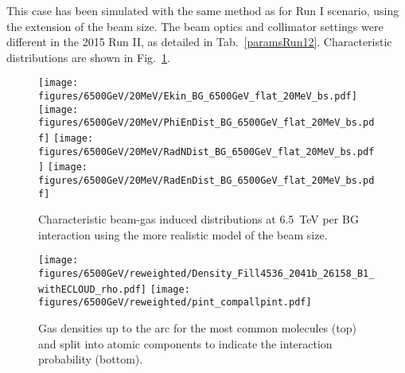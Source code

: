 This case has been simulated with the same method as for Run I scenario, using the extension of the beam size. The beam optics and collimator settings were different in the 2015 Run II, as detailed in Tab.~\ref{paramsRun12}. Characteristic distributions are shown in Fig.~\ref{bg6500}.

\begin{figure}[!htb]
\begin{center}
  \texttt{[image: figures/6500GeV/20MeV/Ekin\_BG\_6500GeV\_flat\_20MeV\_bs.pdf]}
  \texttt{[image: figures/6500GeV/20MeV/PhiEnDist\_BG\_6500GeV\_flat\_20MeV\_bs.pdf]}
  \texttt{[image: figures/6500GeV/20MeV/RadNDist\_BG\_6500GeV\_flat\_20MeV\_bs.pdf]}
  \texttt{[image: figures/6500GeV/20MeV/RadEnDist\_BG\_6500GeV\_flat\_20MeV\_bs.pdf]}
\end{center}
\vspace{-0.6cm}
 \caption{Characteristic beam-gas induced distributions at 6.5~TeV per BG interaction using the more realistic model of the beam size.
  \label{bg6500}}
\end{figure}


\begin{figure}
\begin{center}
  \texttt{[image: figures/6500GeV/reweighted/Density\_Fill4536\_2041b\_26158\_B1\_withECLOUD\_rho.pdf]}
  \texttt{[image: figures/6500GeV/reweighted/pint\_compallpint.pdf]}
\end{center}
\vspace{-0.6cm}
 \caption{Gas densities up to the arc for the most common molecules (top) and split into atomic components to indicate the interaction probability (bottom).
  \label{pressure2015}}
\end{figure}



